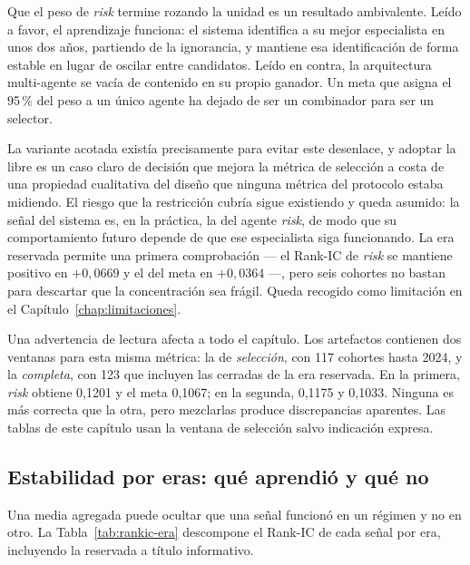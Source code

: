 Que el peso de \textit{risk} termine rozando la unidad es un resultado ambivalente. Leído a favor,
el aprendizaje funciona: el sistema identifica a su mejor especialista en unos dos años, partiendo
de la ignorancia, y mantiene esa identificación de forma estable en lugar de oscilar entre
candidatos. Leído en contra, la arquitectura multi-agente se vacía de contenido en su propio
ganador. Un meta que asigna el 95\,\% del peso a un único agente ha dejado de ser un combinador para
ser un selector.

La variante acotada existía precisamente para evitar este desenlace, y adoptar la libre es un caso
claro de decisión que mejora la métrica de selección a costa de una propiedad cualitativa del
diseño que ninguna métrica del protocolo estaba midiendo. El riesgo que la restricción cubría sigue
existiendo y queda asumido: la señal del sistema es, en la práctica, la del agente \textit{risk}, de
modo que su comportamiento futuro depende de que ese especialista siga funcionando. La era reservada
permite una primera comprobación --- el Rank-IC de \textit{risk} se mantiene positivo en
$+0{,}0669$ y el del meta en $+0{,}0364$ ---, pero seis cohortes no bastan para descartar que la concentración sea frágil. Queda recogido como limitación en
el Capítulo~\ref{chap:limitaciones}.

Una advertencia de lectura afecta a todo el capítulo. Los artefactos contienen dos ventanas para
esta misma métrica: la de \emph{selección}, con 117 cohortes hasta 2024, y la \emph{completa}, con
123 que incluyen las cerradas de la era reservada. En la primera, \textit{risk} obtiene 0,1201 y el
meta 0,1067; en la segunda, 0,1175 y 0,1033. Ninguna es más correcta que la otra, pero mezclarlas
produce discrepancias aparentes. Las tablas de este capítulo usan la ventana de selección salvo
indicación expresa.

\subsection*{Estabilidad por eras: qué aprendió y qué no}
\label{sec:eras}

Una media agregada puede ocultar que una señal funcionó en un régimen y no en otro. La
Tabla~\ref{tab:rankic-era} descompone el Rank-IC de cada señal por era, incluyendo la reservada a
título informativo.

\begin{table}[H]
  \centering
  \small
  \caption{Rank-IC medio por señal y era.}
  \label{tab:rankic-era}
  
  \caption*{Las tres primeras columnas son ventana de selección; la cuarta es la era reservada y no
  intervino en ninguna decisión.}
\end{table}


